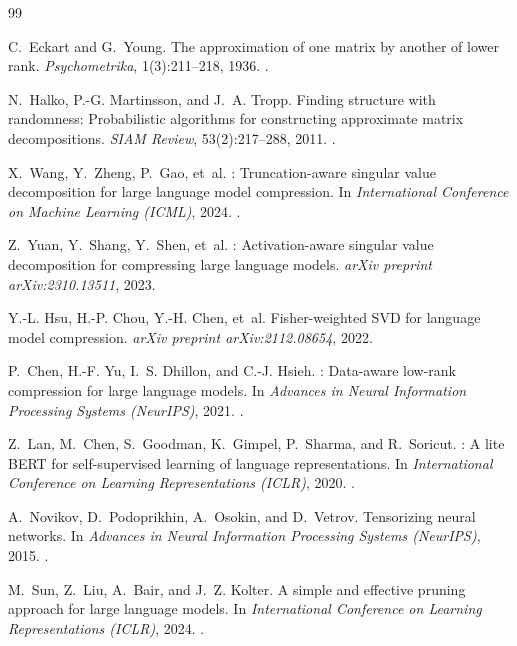 \begin{thebibliography}{99}

C.~Eckart and G.~Young.
\newblock The approximation of one matrix by another of lower rank.
\newblock \emph{Psychometrika}, 1(3):211--218, 1936.
\newblock {}.

N.~Halko, P.-G. Martinsson, and J.~A. Tropp.
\newblock Finding structure with randomness: Probabilistic algorithms for constructing approximate matrix decompositions.
\newblock \emph{SIAM Review}, 53(2):217--288, 2011.
\newblock {}.

X.~Wang, Y.~Zheng, P.~Gao, et~al.
: Truncation-aware singular value decomposition for large language model compression.
\newblock In \emph{International Conference on Machine Learning (ICML)}, 2024.
\newblock {}.

Z.~Yuan, Y.~Shang, Y.~Shen, et~al.
: Activation-aware singular value decomposition for compressing large language models.
\newblock \emph{arXiv preprint arXiv:2310.13511}, 2023.

Y.-L. Hsu, H.-P. Chou, Y.-H. Chen, et~al.
\newblock Fisher-weighted {SVD} for language model compression.
\newblock \emph{arXiv preprint arXiv:2112.08654}, 2022.

P.~Chen, H.-F. Yu, I.~S. Dhillon, and C.-J. Hsieh.
: Data-aware low-rank compression for large language models.
\newblock In \emph{Advances in Neural Information Processing Systems (NeurIPS)}, 2021.
\newblock {}.

Z.~Lan, M.~Chen, S.~Goodman, K.~Gimpel, P.~Sharma, and R.~Soricut.
: A lite {BERT} for self-supervised learning of language representations.
\newblock In \emph{International Conference on Learning Representations (ICLR)}, 2020.
\newblock {}.

A.~Novikov, D.~Podoprikhin, A.~Osokin, and D.~Vetrov.
\newblock Tensorizing neural networks.
\newblock In \emph{Advances in Neural Information Processing Systems (NeurIPS)}, 2015.
\newblock {}.

M.~Sun, Z.~Liu, A.~Bair, and J.~Z. Kolter.
\newblock A simple and effective pruning approach for large language models.
\newblock In \emph{International Conference on Learning Representations (ICLR)}, 2024.
\newblock {}.


\end{thebibliography}
